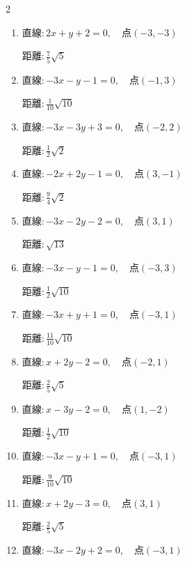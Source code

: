 \begin{multicols}{2}
\begin{enumerate}
  \itemsep=30pt
  \item $直線:2x+y+2=0,\quad 点 ( -3, -3 )$

        $\displaystyle 距離 : \frac{7}{5}\sqrt{5}$

  \item $直線:-3x-y-1=0,\quad 点 ( -1, 3 )$

        $\displaystyle 距離 : \frac{1}{10}\sqrt{10}$

  \item $直線:-3x-3y+3=0,\quad 点 ( -2, 2 )$

        $\displaystyle 距離 : \frac{1}{2}\sqrt{2}$

  \item $直線:-2x+2y-1=0,\quad 点 ( 3, -1 )$

        $\displaystyle 距離 : \frac{9}{4}\sqrt{2}$

  \item $直線:-3x-2y-2=0,\quad 点 ( 3, 1 )$

        $\displaystyle 距離 : \sqrt{13}$

  \item $直線:-3x-y-1=0,\quad 点 ( -3, 3 )$

        $\displaystyle 距離 : \frac{1}{2}\sqrt{10}$

  \item $直線:-3x+y+1=0,\quad 点 ( -3, 1 )$

        $\displaystyle 距離 : \frac{11}{10}\sqrt{10}$

  \item $直線:x+2y-2=0,\quad 点 ( -2, 1 )$

        $\displaystyle 距離 : \frac{2}{5}\sqrt{5}$

  \item $直線:x-3y-2=0,\quad 点 ( 1, -2 )$

        $\displaystyle 距離 : \frac{1}{2}\sqrt{10}$

  \item $直線:-3x-y+1=0,\quad 点 ( -3, 1 )$

        $\displaystyle 距離 : \frac{9}{10}\sqrt{10}$

\columnbreak %

  \item $直線:x+2y-3=0,\quad 点 ( 3, 1 )$

        $\displaystyle 距離 : \frac{2}{5}\sqrt{5}$

  \item $直線:-3x-2y+2=0,\quad 点 ( -3, 1 )$


\end{enumerate}
\end{multicols}
